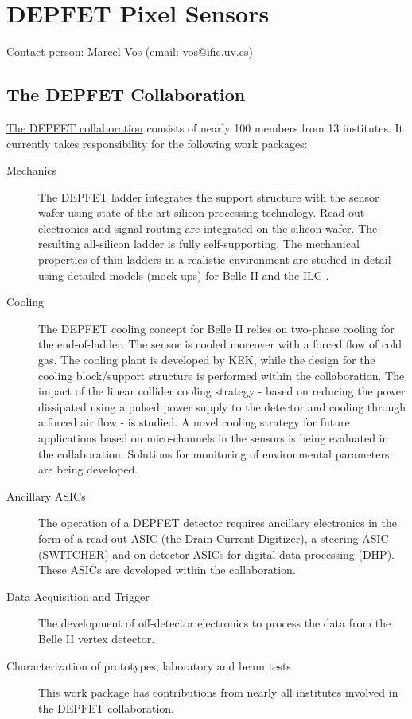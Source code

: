 \section{DEPFET Pixel Sensors}
Contact person: Marcel Vos (email: vos@ific.uv.es)
\label{sec:DEPFET}
\subsection{The DEPFET Collaboration}
\href{http://www.hll.mpg.de/twiki/bin/view/DEPFET/CollaborationList}{The DEPFET collaboration} consists of nearly 100 members from 13 institutes. It currently takes responsibility for the following work packages:
\begin{description}
\item[Mechanics] {The DEPFET ladder integrates the support structure with the sensor wafer using state-of-the-art silicon processing technology. Read-out electronics and signal routing are integrated on the silicon wafer. The resulting all-silicon ladder is fully self-supporting. The mechanical properties of thin ladders in a realistic environment are studied in detail using detailed models (mock-ups) for Belle II and the ILC .}
\item[Cooling] {The DEPFET cooling concept for Belle II relies on two-phase  cooling for the end-of-ladder. The sensor is cooled moreover with a forced flow of cold gas. The  cooling plant is developed by KEK, while the design for the cooling block/support structure is performed within the collaboration. The impact of the linear collider cooling strategy - based on reducing the power dissipated using a pulsed power supply to the detector and cooling through a forced air flow - is studied. A novel cooling strategy for future applications based on mico-channels in the sensors is being evaluated in the collaboration. Solutions for monitoring of environmental parameters are being developed.}
\item[Ancillary ASICs] {The operation of a DEPFET detector requires ancillary electronics in the form of a read-out ASIC (the Drain Current Digitizer), a steering ASIC (SWITCHER) and on-detector ASICs for digital data processing (DHP). These ASICs are developed within the collaboration.}
\item[Data Acquisition and Trigger] {The development of off-detector electronics to process the data from the Belle II vertex detector.}
\item[Characterization of prototypes, laboratory and beam tests] {This work package has contributions from nearly all institutes involved in the DEPFET collaboration.}
\end{description}

